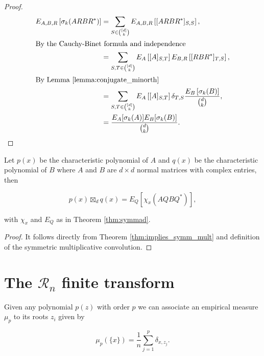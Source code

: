 \begin{proof}
    \begin{align*}
        E_{A,B,R} \left[\sigma_k(ARBR^*)\right] &= \sum_{S \in \binom{[d]}{k}} E_{A,B,R} \left[[ARBR^*]_{S,S}\right],\\ 
        \intertext{By the Cauchy-Binet formula and independence}
        &= \sum_{S,T \in \binom{[d]}{k}} E_A\left[ [A]_{S,T} \right] E_{B,R} \left[ [RBR^*]_{T,S} \right],\\ 
        \intertext{By Lemma \ref{lemma:conjugate_minorth}}
        &= \sum_{S,T \in \binom{[d]}{k}} E_A\left[[A]_{S,T} \right] \delta_{T,S}\frac{E_B\left[ \sigma_k(B)\right]}{\binom{d}{k}},\\
        &= \frac{E_A[\sigma_k(A)]E_B[\sigma_k(B)]}{\binom{d}{k}}.
    \end{align*}
\end{proof}


\begin{theorem}
    Let $p(x)$ be the characteristic polynomial of $A$ and $q(x)$ be the characteristic polynomial of $B$ where $A$ and $B$ are $d\times d$ normal matrices with complex entries, then 

    \begin{equation*}
        p(x) \boxtimes_d q(x) = E_Q \left[ \chi_x (AQBQ^*) \right],
    \end{equation*}

    \noindent with $\chi_x$ and $E_Q$ as in Theorem \ref{thm:symmad}.
\end{theorem}

\begin{proof}
    It follows directly from Theorem \ref{thm:implies_symm_mult} and definition of the symmetric multiplicative convolution.
\end{proof}

\section{The $\mathcal R_n$ finite transform} 


Given any polynomial $p(z)$ with order $p$ we can associate an empirical measure $\mu_p$ to its roots $z_i$ given by

\begin{equation*}
    \mu_p(\{x\}) = \frac1n\sum_{j=1}^p \delta_{x,z_j}.
\end{equation*}

